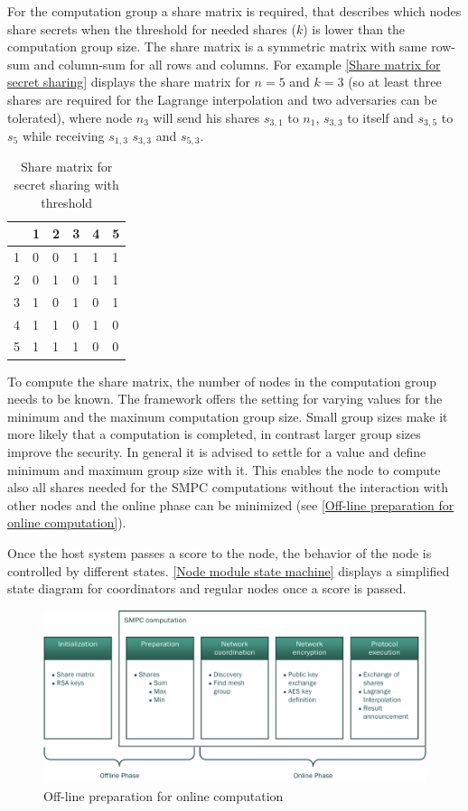 For the computation group a share matrix is required, that describes which nodes share secrets when the threshold for needed shares ($k$) is lower than the computation group size. The share matrix is a symmetric matrix with same row-sum and column-sum for all rows and columns. For example \autoref{Share matrix for secret sharing} displays the share matrix for $n=5$ and $k=3$ (so at least three shares are required for the Lagrange interpolation and two adversaries can be tolerated), where node $n_3$ will send his shares $s_{3,1}$ to $n_1$, $s_{3,3}$ to itself and $s_{3,5}$ to $s_5$ while receiving $s_{1,3}$ $s_{3,3}$ and $s_{5,3}$.
\begin{table}[]
	\centering
	\caption[Share matrix for secret sharing]{Share matrix for secret sharing with threshold}
	\label{Share matrix for secret sharing}
	\begin{tabular}{l|lllll}
		& 1 & 2 & 3 & 4 & 5 \\ \hline
		1 & 0 & 0 & 1 & 1 & 1 \\
		2 & 0 & 1 & 0 & 1 & 1 \\
		3 & 1 & 0 & 1 & 0 & 1 \\
		4 & 1 & 1 & 0 & 1 & 0 \\
		5 & 1 & 1 & 1 & 0 & 0
	\end{tabular}
\end{table}

To compute the share matrix, the number of nodes in the computation group needs to be known. The framework offers the setting for varying values for the minimum and the maximum computation group size. Small group sizes make it more likely that a computation is completed, in contrast larger group sizes improve the security. In general it is advised to settle for a value and define minimum and maximum group size with it. This enables the node to compute also all shares needed for the \gls{SMPC} computations without the interaction with other nodes and the online phase can be minimized (see \autoref{Off-line preparation for online computation}).

Once the host system passes a score to the node, the behavior of the node is controlled by different states. \autoref{Node module state machine} displays a simplified state diagram for coordinators and regular nodes once a score is passed.

\begin{figure}[!htbp] %
	\caption{Off-line preparation for online computation} \label{Off-line preparation for online computation}
	\includegraphics[scale=1.0]{figures/node_phases.png}
\end{figure}

